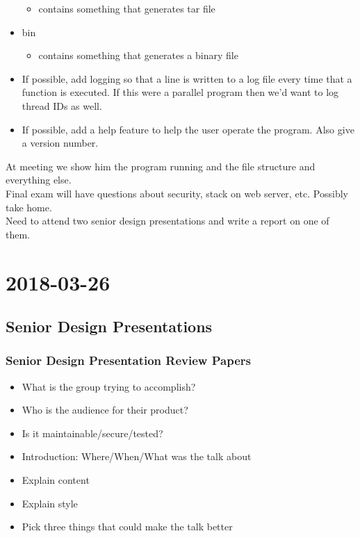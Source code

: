 \documentclass{report}
\newcommand{\mychapter}[2]{
	\setcounter{chapter}{#1}
	\setcounter{section}{0}
	\chapter*{#2}
	\addcontentsline{toc}{chapter}{#2}
}
\begin{document}
\begin{itemize}
\begin{itemize}
	\item contains something that generates tar file
	\end{itemize}
\item bin 
	\begin{itemize}
	\item contains something that generates a binary file
	\end{itemize}
\item If possible, add logging so that a line is written to a log file every time that a function is executed. If this were a parallel program then we'd want to log thread IDs as well.
\item If possible, add a help feature to help the user operate the program. Also give a version number.
\end{itemize}
At meeting we show him the program running and the file structure and everything else.\\
Final exam will have questions about security, stack on web server, etc. Possibly take home.\\
Need to attend two senior design presentations and write a report on one of them.


\mychapter{4}{2018-03-26}
\section{Senior Design Presentations}
\subsection{Senior Design Presentation Review Papers}
\begin{itemize}
\item What is the group trying to accomplish?
\item Who is the audience for their product?
\item Is it maintainable/secure/tested?
\item Introduction: Where/When/What was the talk about
\item Explain content
\item Explain style
\item Pick three things that could make the talk better
\end{itemize}
\end{document}
